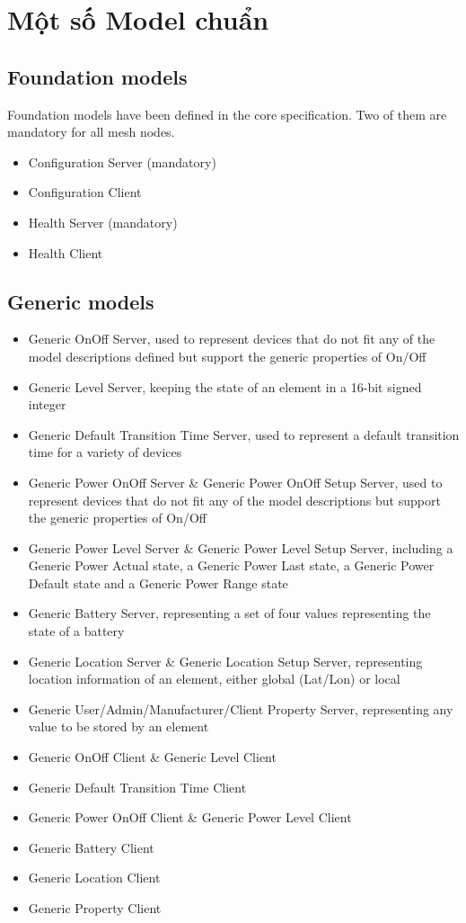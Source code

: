 \appendix
\chapter{Một số Model chuẩn}\label{models}

\section{Foundation models}
Foundation models have been defined in the core specification. Two of them are mandatory for all mesh nodes.

\begin{itemize}
	\item Configuration Server (mandatory)
	\item Configuration Client
	\item Health Server (mandatory)
	\item Health Client
\end{itemize}

\section{Generic models}
\begin{itemize}
\item Generic OnOff Server, used to represent devices that do not fit any of the model descriptions defined but support the generic properties of On/Off
\item Generic Level Server, keeping the state of an element in a 16-bit signed integer
\item Generic Default Transition Time Server, used to represent a default transition time for a variety of devices
\item Generic Power OnOff Server \& Generic Power OnOff Setup Server, used to represent devices that do not fit any of the model descriptions but support the generic properties of On/Off
\item Generic Power Level Server \& Generic Power Level Setup Server, including a Generic Power Actual state, a Generic Power Last state, a Generic Power Default state and a Generic Power Range state
\item Generic Battery Server, representing a set of four values representing the state of a battery
\item Generic Location Server \& Generic Location Setup Server, representing location information of an element, either global (Lat/Lon) or local
\item Generic User/Admin/Manufacturer/Client Property Server, representing any value to be stored by an element
\item Generic OnOff Client \& Generic Level Client
\item Generic Default Transition Time Client
\item Generic Power OnOff Client \& Generic Power Level Client
\item Generic Battery Client
\item Generic Location Client
\item Generic Property Client
\end{itemize}

